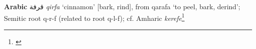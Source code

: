 \begin{etymology}\label{ety:qirfa}
\textbf{Arabic} {قرفة} \textit{qirfa} `cinnamon' [bark, rind], from qarafa `to peel, bark, derind'; Semitic root q-r-f (related to root q-l-f); cf. Amharic \textit{kerefe}\footnote{\textcites[888]{wehr_dictionary_1976}[427]{leslau_comparative_1991}}
\end{etymology}